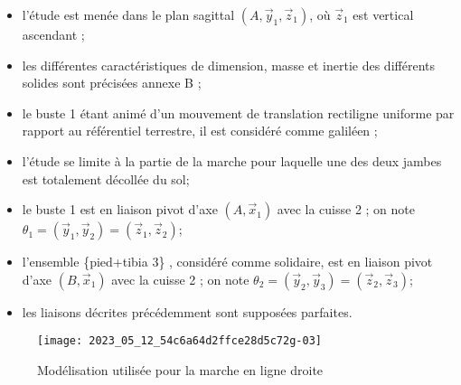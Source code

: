 \begin{itemize}
  \item l'étude est menée dans le plan sagittal $\left(A, \vec{y}_{1}, \vec{z}_{1}\right)$, où $\vec{z}_{1}$ est vertical ascendant ;
  \item les différentes caractéristiques de dimension, masse et inertie des différents solides sont précisées annexe B ;
  \item le buste 1 étant animé d'un mouvement de translation rectiligne uniforme par rapport au référentiel terrestre, il est considéré comme galiléen ;
  \item l'étude se limite à la partie de la marche pour laquelle une des deux jambes est totalement décollée du sol; %
  \item le buste 1 est en liaison pivot d'axe $\left(A, \vec{x}_{1}\right)$ avec la cuisse 2 ; on note $\theta_{1}=\left(\vec{y}_{1}, \vec{y}_{2}\right)=\left(\vec{z}_{1}, \vec{z}_{2}\right)$;
  \item l'ensemble \{pied+tibia 3\} , considéré comme solidaire, est en liaison pivot d'axe $\left(B, \vec{x}_{1}\right)$ avec la cuisse 2 ; on note $\theta_{2}=\left(\vec{y}_{2}, \vec{y}_{3}\right)=\left(\vec{z}_{2}, \vec{z}_{3}\right)$;
  \item les liaisons décrites précédemment sont supposées parfaites.
\end{itemize}


\begin{figure}[!h]
\centering
\texttt{[image: 2023\_05\_12\_54c6a64d2ffce28d5c72g-03]}
\caption{Modélisation utilisée pour la marche en ligne droite \label{ccs_psi_2023_fig_04}}
\end{figure}
\fi

